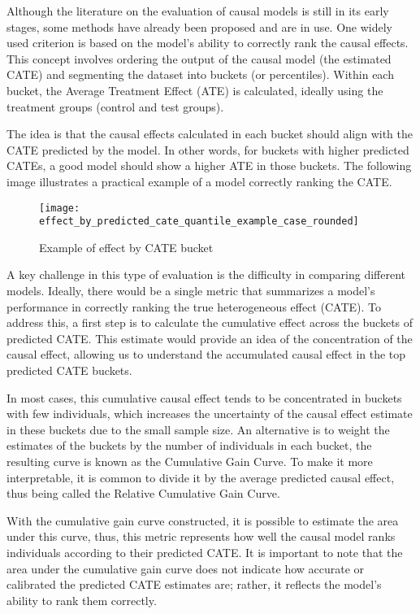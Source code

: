 Although the literature on the evaluation of causal models is still in its early stages, some methods have already been proposed and are in use. One widely used criterion is based on the model’s ability to correctly rank the causal effects.
This concept involves ordering the output of the causal model (the estimated \gls{CATE}) and segmenting the dataset into buckets (or percentiles). Within each bucket, the Average Treatment Effect (\gls{ATE}) is calculated, ideally using the
treatment groups (control and test groups).

The idea is that the causal effects calculated in each bucket should align with the \gls{CATE} predicted by the model. In other words, for buckets with higher predicted CATEs, a good model should show a higher \gls{ATE} in those buckets. 
The following image illustrates a practical example of a model correctly ranking the \gls{CATE}.

\begin{figure}[htbp]
  \centering
  \texttt{[image: effect\_by\_predicted\_cate\_quantile\_example\_case\_rounded]}
  \caption{Example of effect by CATE bucket}
  \label{fig:effect_by_quantile}
\end{figure}

A key challenge in this type of evaluation is the difficulty in comparing different models. Ideally, there would be a single metric that summarizes a model’s performance in correctly ranking the true heterogeneous effect (\gls{CATE}).
To address this, a first step is to calculate the cumulative effect across the buckets of predicted \gls{CATE}. This estimate would provide an idea of the concentration of the causal effect, allowing us to understand the accumulated causal 
effect in the top predicted CATE buckets.

In most cases, this cumulative causal effect tends to be concentrated in buckets with few individuals, which increases the uncertainty of the causal effect estimate in these buckets due to the small sample size. An alternative is to weight 
the estimates of the buckets by the number of individuals in each bucket, the resulting curve is known as the Cumulative Gain Curve. To make it more interpretable, it is common to divide it by the average predicted causal effect, thus being 
called the Relative Cumulative Gain Curve.

With the cumulative gain curve constructed, it is possible to estimate the area under this curve, thus, this metric represents how well the causal model ranks individuals according to their predicted \gls{CATE}. It is important to note that 
the area under the cumulative gain curve does not indicate how accurate or calibrated the predicted \gls{CATE} estimates are; rather, it reflects the model’s ability to rank them correctly.

